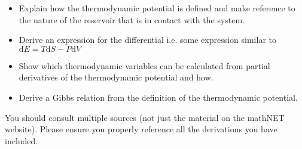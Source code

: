 \documentclass[a4paper]{article}
\begin{document}
\begin{itemize}
\item Explain how the thermodynamic potential is defined and make reference to the nature of the reservoir that is in contact with the system.
\item Derive an expression for the differential i.e. some expression similar to $\textrm{d}E = T\textrm{d}S - P\textrm{d}V$
\item Show which thermodynamic variables can be calculated from partial derivatives of the thermodynamic potential and how.
\item Derive a Gibbs relation from the definition of the thermodynamic potential. 
\end{itemize}

You should consult multiple sources (not just the material on the mathNET website).  Please ensure you properly reference all the derivations you have included.
\end{document}
